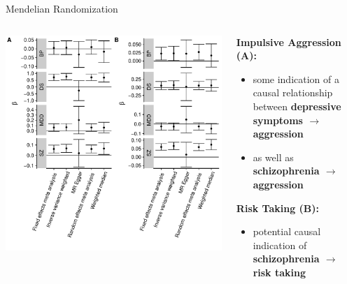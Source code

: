 \documentclass{beamer}
\begin{document}
  \begin{frame}[t]{Mendelian Randomization}
    \tiny
    \begin{columns}[T]
      \begin{column}[T]{0.6\textwidth}
        \centering
        \includegraphics[width=0.99\linewidth]{../ukb_psychiatric/figures/overall_mr_effect.pdf}
      \end{column}
      \begin{column}[T]{0.5\textwidth}

        \textbf{Impulsive Aggression (A):}\\
        \begin{itemize}
          \item some indication of a causal relationship between \textbf{depressive symptoms $\rightarrow$ aggression } 
          \item as well as \textbf{schizophrenia $\rightarrow$ aggression}
        \end{itemize}

        \textbf{Risk Taking (B):}\\
        \begin{itemize}
          \item potential causal indication of \\ \textbf{schizophrenia $\rightarrow$ risk taking} 
        \end{itemize}


\end{column}
\end{columns}
\end{frame}
\end{document}
